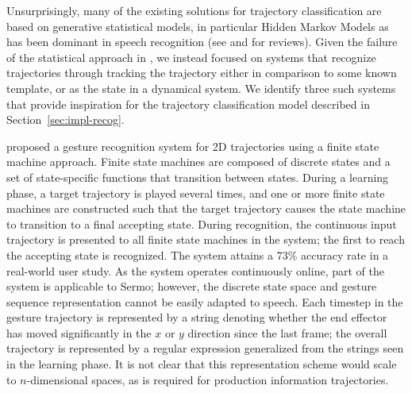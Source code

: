 
Unsurprisingly, many of the existing
solutions for trajectory classification
are based on generative statistical models,
in particular Hidden Markov Models
as has been dominant in speech recognition
(see \citealt{mlich2008,nascimento2010}
and \citealt{mitra2007,weinland2011,rautaray2015}
for reviews).
Given the failure of the statistical approach
in \citet{mitra2014},
we instead focused on systems
that recognize trajectories
through tracking the trajectory
either in comparison to some known template,
or as the state in a dynamical system.
We identify three such systems
that provide inspiration
for the trajectory classification model
described in Section~\ref{sec:impl-recog}.

\citet{kiliboz2015} proposed
a gesture recognition system
for 2D trajectories
using a finite state machine approach.
Finite state machines are composed of
discrete states and a set of state-specific
functions that transition between states.
During a learning phase,
a target trajectory is played
several times,
and one or more finite state machines
are constructed such that
the target trajectory
causes the state machine
to transition to a final accepting state.
During recognition,
the continuous input trajectory
is presented to all finite state machines
in the system;
the first to reach the accepting state is recognized.
The system attains a 73\% accuracy rate
in a real-world user study.
As the system operates continuously online,
part of the system is applicable to Sermo;
however, the discrete state space and
gesture sequence representation
cannot be easily adapted to speech.
Each timestep in the gesture trajectory
is represented by a string denoting whether the
end effector has moved significantly
in the $x$ or $y$ direction since the last frame;
the overall trajectory is represented
by a regular expression generalized from
the strings seen in the learning phase.
It is not clear that this representation scheme
would scale to $n$-dimensional spaces,
as is required for production information trajectories.

